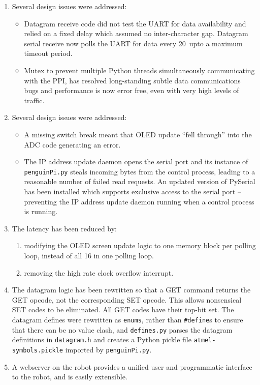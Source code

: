 \documentclass[11pt,fleqn]{article}
\begin{document}
\begin{enumerate}
\item Several design issues were addressed:
\begin{itemize}
\item Datagram receive code did not test the UART for data availability and relied on a fixed delay which assumed no inter-character gap.
Datagram serial receive now polls the UART for data every 20\us\ upto a maximum timeout period.
\item Mutex to prevent multiple Python threads simultaneously communicating with the PPI, has  resolved long-standing subtle data communications bugs and performance is now error free, even with very high
levels of traffic.
\end{itemize}

\item Several design issues were addressed:
\begin{itemize}
\item A missing switch break meant that OLED update ``fell through'' into the ADC code generating an error.  
\item The IP address update daemon opens the serial port and its instance of \texttt{penguinPi.py}  steals incoming bytes from the control process, leading to a reasonable
number of failed read requests. An updated version of PySerial has been installed which supports exclusive access to the serial port --
preventing the IP address update daemon running when a control process is running.
\end{itemize}  

\item The latency has been reduced by:
\begin{enumerate}
\item modifying the OLED screen update logic to one memory block per polling loop, instead of all 16 in one polling loop.
\item removing the high rate clock overflow interrupt.
\end{enumerate}

\item The datagram logic has been rewritten so that a GET command returns the GET opcode, not the corresponding SET opcode.  This allows nonsensical SET codes to be eliminated. All GET codes have their top-bit set.
The datagram defines were rewritten as \texttt{enums}, rather than \texttt{\#define}s to ensure that there can be no value clash, and \texttt{defines.py} parses the
datagram definitions in \texttt{datagram.h} and creates a Python pickle file \texttt{atmel-symbols.pickle} imported by \texttt{penguinPi.py}.

\item A webserver on the robot provides a unified user and programmatic interface to the robot, and is easily extensible.

\end{enumerate}
\end{document}
